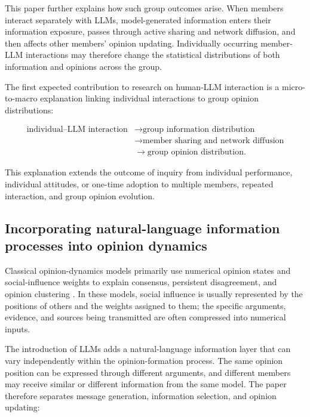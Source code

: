 \documentclass[11pt,a4paper]{article}
\begin{document}
This paper further explains how such group outcomes arise. When members interact separately with LLMs, model-generated information enters their information exposure, passes through active sharing and network diffusion, and then affects other members' opinion updating. Individually occurring member-LLM interactions may therefore change the statistical distributions of both information and opinions across the group.

The first expected contribution to research on human-LLM interaction is a micro-to-macro explanation linking individual interactions to group opinion distributions:

\begin{equation*}
\begin{aligned}\text{individual--LLM interaction} &\rightarrow \text{group information distribution} \\
&\rightarrow \text{member sharing and network diffusion} \\
&\rightarrow \text{group opinion distribution}.\end{aligned}
\end{equation*}

This explanation extends the outcome of inquiry from individual performance, individual attitudes, or one-time adoption to multiple members, repeated interaction, and group opinion evolution.

\subsection{Incorporating natural-language information processes into opinion dynamics}

Classical opinion-dynamics models primarily use numerical opinion states and social-influence weights to explain consensus, persistent disagreement, and opinion clustering \cite{degroot1974,friedkin1990,hegselmann2002}. In these models, social influence is usually represented by the positions of others and the weights assigned to them; the specific arguments, evidence, and sources being transmitted are often compressed into numerical inputs.

The introduction of LLMs adds a natural-language information layer that can vary independently within the opinion-formation process. The same opinion position can be expressed through different arguments, and different members may receive similar or different information from the same model. The paper therefore separates message generation, information selection, and opinion updating:
\end{document}
